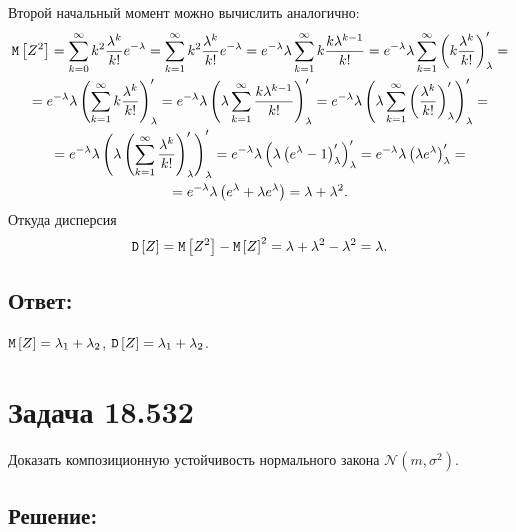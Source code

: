 Второй начальный момент можно вычислить аналогично:
\begin{multline}
    \mathtt{M} \left [ Z^2 \right ]
    = \sum_{k=0}^{\infty} k^2 \frac{\lambda^k}{k!} e^{-\lambda}
    = \sum_{k=1}^{\infty} k^2 \frac{\lambda^k}{k!} e^{-\lambda}
    = e^{-\lambda} \lambda \sum_{k=1}^{\infty} k \frac{k \lambda^{k-1}}{k!}
    = e^{-\lambda} \lambda \sum_{k=1}^{\infty} \left ( k \frac{\lambda^k}{k!} \right )_{\lambda}^{\prime} = \\
    = e^{-\lambda} \lambda \left ( \sum_{k=1}^{\infty} k \frac{\lambda^k}{k!} \right )_{\lambda}^{\prime}
    = e^{-\lambda} \lambda \left ( \lambda \sum_{k=1}^{\infty} \frac{k \lambda^{k-1}}{k!} \right )_{\lambda}^{\prime}
    = e^{-\lambda} \lambda \left ( \lambda \sum_{k=1}^{\infty} \left ( \frac{\lambda^{k}}{k!} \right )_{\lambda}^{\prime} \right )_{\lambda}^{\prime} = \\
    = e^{-\lambda} \lambda \left ( \lambda \left ( \sum_{k=1}^{\infty} \frac{\lambda^{k}}{k!} \right )_{\lambda}^{\prime} \right )_{\lambda}^{\prime}
    = e^{-\lambda} \lambda \left ( \lambda \left ( e^\lambda - 1 \right )_{\lambda}^{\prime} \right )_{\lambda}^{\prime}
    = e^{-\lambda} \lambda \left ( \lambda e^\lambda \right )_{\lambda}^{\prime} = \\
    = e^{-\lambda} \lambda \left ( e^\lambda + \lambda e^\lambda \right )
    = \lambda + \lambda^2.
\end{multline}
Откуда дисперсия
\begin{equation}
    \mathtt{D} \left [ Z \right ]
    = \mathtt{M} \left [ Z^2 \right ] - \mathtt{M} \left [ Z \right ]^2
    = \lambda + \lambda^2 - \lambda^2
    = \lambda.
\end{equation}

\subsection*{Ответ:}
$\mathtt{M} \left [ Z \right ] = \lambda_1 + \lambda_2$, $\mathtt{D} \left [ Z \right ] = \lambda_1 + \lambda_2$.

\section*{Задача 18.532}

Доказать композиционную устойчивость нормального закона $\mathcal{N} \left ( m, \sigma^2 \right )$.

\subsection*{Решение:}

